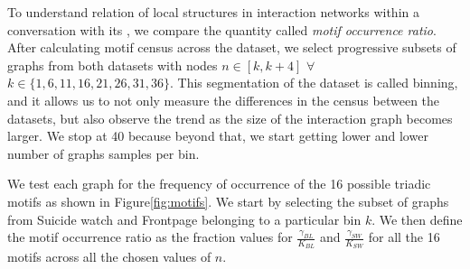 To understand relation of local structures in interaction networks within a conversation with its , we compare the quantity called \textsl{motif occurrence ratio}. 
After calculating motif census across the dataset\cite{Batagelj2001}, we select progressive subsets of graphs from both datasets with nodes $n \in [k , k+4]$ $\forall$  $k \in \{1, 6 , 11 , 16 , 21 , 26 , 31 , 36\}$. This segmentation of the dataset is called binning, and it allows us to not only measure the differences in the census between the datasets, but also observe the trend as the size of the interaction graph becomes larger. We stop at 40 because beyond that, we start getting lower and lower number of graphs samples per bin.  

We test each graph for the frequency of occurrence of the 16 possible triadic motifs as shown in Figure\ref{fig:motifs}. We start by selecting the subset of graphs from Suicide watch and Frontpage belonging to a particular bin $k$. 
We then define the motif occurrence ratio as the fraction values for $\frac{\gamma_{BL}}{K_{BL}}$ and $\frac{\gamma_{SW}}{K_{SW}}$ for all the 16 motifs across all the chosen values of $n$. 


